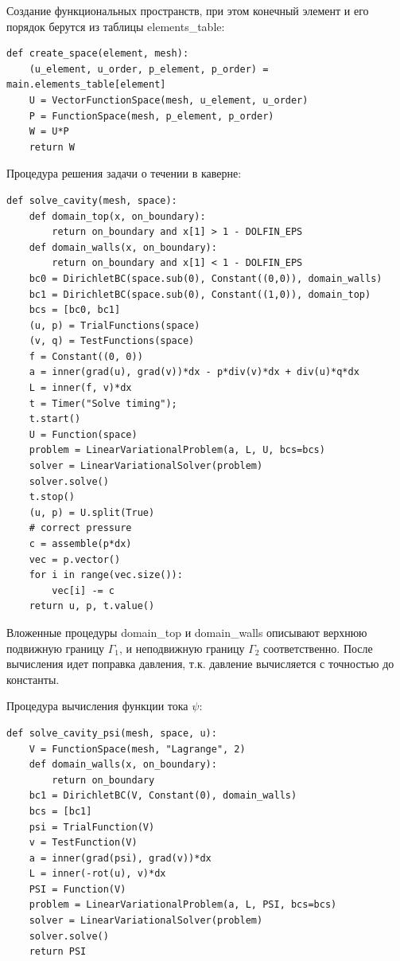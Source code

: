 \documentclass[12pt]{article}
\begin{document}
Создание функциональных пространств, при этом конечный элемент и его порядок берутся из таблицы elements\_table:
\begin{lstlisting}
def create_space(element, mesh):
    (u_element, u_order, p_element, p_order) = main.elements_table[element]
    U = VectorFunctionSpace(mesh, u_element, u_order)
    P = FunctionSpace(mesh, p_element, p_order)
    W = U*P
    return W
\end{lstlisting}

Процедура решения задачи о течении в каверне: 
\begin{lstlisting}       
def solve_cavity(mesh, space):
    def domain_top(x, on_boundary):
        return on_boundary and x[1] > 1 - DOLFIN_EPS  
    def domain_walls(x, on_boundary):
        return on_boundary and x[1] < 1 - DOLFIN_EPS    
    bc0 = DirichletBC(space.sub(0), Constant((0,0)), domain_walls)
    bc1 = DirichletBC(space.sub(0), Constant((1,0)), domain_top)
    bcs = [bc0, bc1]    
    (u, p) = TrialFunctions(space)
    (v, q) = TestFunctions(space)
    f = Constant((0, 0))       
    a = inner(grad(u), grad(v))*dx - p*div(v)*dx + div(u)*q*dx
    L = inner(f, v)*dx    
    t = Timer("Solve timing");
    t.start()            
    U = Function(space)
    problem = LinearVariationalProblem(a, L, U, bcs=bcs)
    solver = LinearVariationalSolver(problem)
    solver.solve()    
    t.stop()    
    (u, p) = U.split(True)        
    # correct pressure
    c = assemble(p*dx)
    vec = p.vector()
    for i in range(vec.size()):
        vec[i] -= c
    return u, p, t.value()
\end{lstlisting}
Вложенные процедуры domain\_top и domain\_walls описывают верхнюю подвижную границу $\Gamma_1$, и неподвижную границу $\Gamma_2$ соответственно. После вычисления идет поправка давления, т.к. давление вычисляется с точностью до константы.

Процедура вычисления функции тока $\psi$:
\begin{lstlisting}
def solve_cavity_psi(mesh, space, u):
    V = FunctionSpace(mesh, "Lagrange", 2)
    def domain_walls(x, on_boundary):
        return on_boundary
    bc1 = DirichletBC(V, Constant(0), domain_walls)    
    bcs = [bc1]
    psi = TrialFunction(V)
    v = TestFunction(V)    
    a = inner(grad(psi), grad(v))*dx
    L = inner(-rot(u), v)*dx    
    PSI = Function(V)
    problem = LinearVariationalProblem(a, L, PSI, bcs=bcs)
    solver = LinearVariationalSolver(problem)
    solver.solve()
    return PSI
\end{lstlisting}
\end{document}
